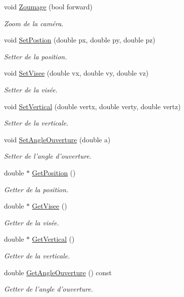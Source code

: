 \begin{DoxyCompactItemize}
void \hyperlink{class_abstract_camera_a658752e59c42aacadb3e05b811c5b733}{Zoumage} (bool forward)
\begin{DoxyCompactList}\small\item\em Zoom de la caméra. \end{DoxyCompactList}\item 
void \hyperlink{class_abstract_camera_abce3fc447411ab866d33c80e3a787425}{Set\+Postion} (double px, double py, double pz)
\begin{DoxyCompactList}\small\item\em Setter de la position. \end{DoxyCompactList}\item 
void \hyperlink{class_abstract_camera_a6d987b85b99a72dc2dbae2bad3add3c2}{Set\+Visee} (double vx, double vy, double vz)
\begin{DoxyCompactList}\small\item\em Setter de la visée. \end{DoxyCompactList}\item 
void \hyperlink{class_abstract_camera_a18b29aed678919cf853368d6708dd218}{Set\+Vertical} (double vertx, double verty, double vertz)
\begin{DoxyCompactList}\small\item\em Setter de la verticale. \end{DoxyCompactList}\item 
void \hyperlink{class_abstract_camera_a2cc297f1c766623fc890030ce343a145}{Set\+Angle\+Ouverture} (double a)
\begin{DoxyCompactList}\small\item\em Setter de l'angle d'ouverture. \end{DoxyCompactList}\item 
double $\ast$ \hyperlink{class_abstract_camera_a59cd96f58f9bf36a8835f28c4b83f71d}{Get\+Position} ()
\begin{DoxyCompactList}\small\item\em Getter de la position. \end{DoxyCompactList}\item 
double $\ast$ \hyperlink{class_abstract_camera_ae78023d4ab2a0b5f09c9704d0358351e}{Get\+Visee} ()
\begin{DoxyCompactList}\small\item\em Getter de la visée. \end{DoxyCompactList}\item 
double $\ast$ \hyperlink{class_abstract_camera_a26576ea56602025af025c67b63c1a081}{Get\+Vertical} ()
\begin{DoxyCompactList}\small\item\em Getter de la verticale. \end{DoxyCompactList}\item 
double \hyperlink{class_abstract_camera_ada5eaaeda93679236af0700e932eccd6}{Get\+Angle\+Ouverture} () const 
\begin{DoxyCompactList}\small\item\em Getter de l'angle d'ouverture. \end{DoxyCompactList}\end{DoxyCompactItemize}
